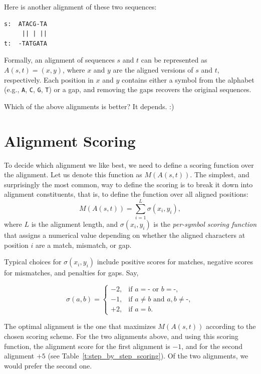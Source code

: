 Here is another alignment of these two sequences:

\begin{verbatim}
s:  ATACG-TA
     || | ||
t:  -TATGATA
\end{verbatim}

Formally, an alignment of sequences $s$ and $t$ can be represented as
$A(s,t) = (x, y)$, where $x$ and $y$ are the aligned versions of $s$ and $t$,
respectively. Each position in $x$ and $y$ contains either a symbol from the
alphabet (e.g., \texttt{A}, \texttt{C}, \texttt{G}, \texttt{T}) or a gap, and
removing the gaps recovers the original sequences.

Which of the above alignments is better? It depends. :)

\section{Alignment Scoring}

To decide which alignment we like best, we need to define a scoring function over the alignment. Let us denote this function as $M(A(s,t))$. The simplest, and surprisingly the most common, way to define the scoring is to break it down into alignment constituents, that is, to define the function over all aligned positions:
\[
M(A(s,t)) = \sum_{i=1}^{L} \sigma(x_i, y_i),
\]
where $L$ is the alignment length, and $\sigma(x_i, y_i)$ is the
\emph{per-symbol scoring function} that assigns a numerical value depending on
whether the aligned characters at position $i$ are a match, mismatch, or gap.

Typical choices for $\sigma(x_i, y_i)$ include positive scores for matches, negative scores for
mismatches, and penalties for gaps. Say,

\[
\sigma(a,b) =
\begin{cases}
-2, & \text{if } a = \texttt{-} \text{ or } b = \texttt{-}, \\
-1, & \text{if } a \neq b \text{ and } a,b \neq \texttt{-}, \\
+2, & \text{if } a = b.
\end{cases}
\]

The optimal alignment is the one that maximizes $M(A(s,t))$ according to the chosen scoring scheme. For the two alignments above, and using this scoring function, the alignment score for the first alignment is $-1$, and for the second alignment $+5$ (see Table~\ref{t:step_by_step_scoring}). Of the two alignments, we would prefer the second one.

